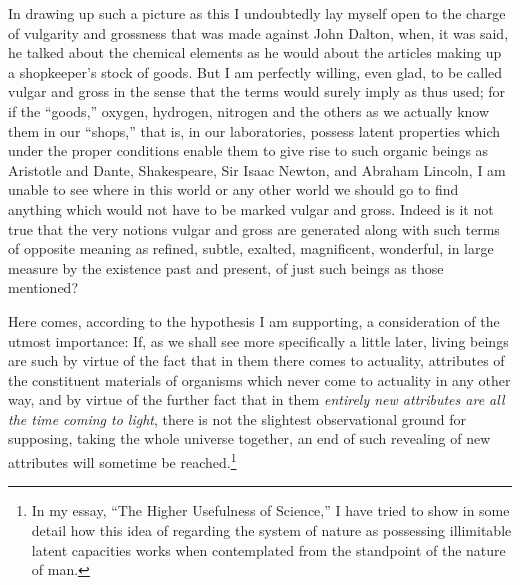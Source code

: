 \documentclass[a4paper, 11pt, oneside, polutonikogreek, english]{article}
\begin{document}
In drawing up such a picture as this I undoubtedly lay myself open to the charge of vulgarity and grossness that was made against John Dalton, when, it was said, he talked about the chemical elements as he would about the articles making up a shopkeeper's stock of goods. But I am perfectly willing, even glad, to be called vulgar and gross in the sense that the terms would surely imply as thus used; for if the ``goods,'' oxygen, hydrogen, nitrogen and the others as we actually know them in our ``shops,'' that is, in our laboratories, possess latent properties which under the proper conditions enable them to give rise to such organic beings as Aristotle and Dante, Shakespeare, Sir Isaac Newton, and Abraham Lincoln, I am unable to see where in this world or any other world we should go to find anything which would not have to be marked vulgar and gross. Indeed is it not true that the very notions vulgar and gross are generated along with such terms of opposite meaning as refined, subtle, exalted, magnificent, wonderful, in large measure by the existence past and present, of just such beings as those mentioned?

Here comes, according to the hypothesis I am supporting, a consideration of the utmost importance: If, as we shall see more specifically a little later, living beings are such by virtue of the fact that in them there comes to actuality, attributes of the constituent materials of organisms which never come to actuality in any other way, and by virtue of the further fact that in them \emph{entirely new attributes are all the time coming to light}, there is not the slightest observational ground for supposing, taking the whole universe together, an end of such revealing of new attributes will sometime be reached.\footnote{In my essay, ``The Higher Usefulness of Science,'' I have tried to show in some detail how this idea of regarding the system of nature as possessing illimitable latent capacities works when contemplated from the standpoint of the nature of man.} 
\end{document}
